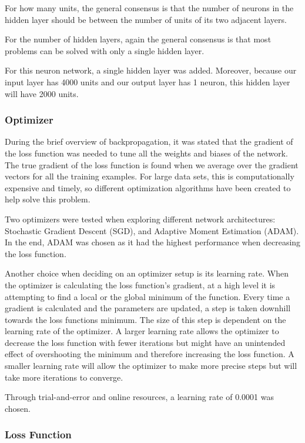 \documentclass[%
 reprint,
 amsmath,amssymb,
 aps,
]{revtex4-2}
\begin{document}
For how many units, the general consensus is that the number of neurons in the hidden layer should be between the number of units of its two adjacent layers.

For the number of hidden layers, again the general consensus is that most problems can be solved with only a single hidden layer.

For this neuron network, a single hidden layer was added. Moreover, because our input layer has 4000 units and our output layer has 1 neuron, this hidden layer will have 2000 units.

\subsubsection{Optimizer}

During the brief overview of backpropagation, it was stated that the gradient of the loss function was needed to tune all the weights and biases of the network. The true gradient of the loss function is found when we average over the gradient vectors for all the training examples. For large data sets, this is computationally expensive and timely, so different optimization algorithms have been created to help solve this problem.

Two optimizers were tested when exploring different network architectures: Stochastic Gradient Descent (SGD), and Adaptive Moment Estimation (ADAM). In the end, ADAM was chosen as it had the highest performance when decreasing the loss function.




Another choice when deciding on an optimizer setup is its learning rate. When the optimizer is calculating the loss function's gradient, at a high level it is attempting to find a local or the global minimum of the function. Every time a gradient is calculated and the parameters are updated, a step is taken downhill towards the loss functions minimum. The size of this step is dependent on the learning rate of the optimizer. A larger learning rate allows the optimizer to decrease the loss function with fewer iterations but might have an unintended effect of overshooting the minimum and therefore increasing the loss function. A smaller learning rate will allow the optimizer to make more precise steps but will take more iterations to converge.

Through trial-and-error and online resources, a learning rate of 0.0001 was chosen.

\subsubsection{Loss Function}
\end{document}
